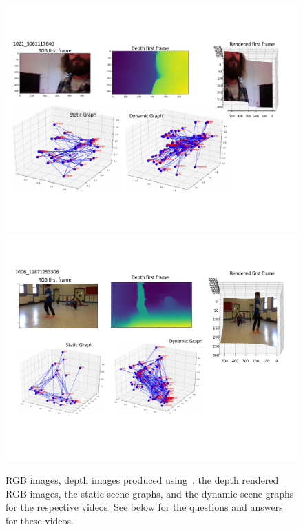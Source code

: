 \documentclass[letterpaper]{article} %
\begin{document}
\begin{figure}
    \centering
    \includegraphics[width=16cm,trim={0cm 3cm 0cm 3.0cm},clip]{./figs/sg_quals_1.pdf}
    \vspace*{10pt}
     \includegraphics[width=16cm,trim={0cm 3cm 0cm 3.0cm},clip]{./figs/sg_quals_2.pdf}
    \caption{RGB images, depth images produced using~\cite{ranftl2019towards}, the depth rendered RGB images, the static scene graphs, and the dynamic scene graphs for the respective videos. See below for the questions and answers for these videos.}
    \label{fig:quals_1}
\end{figure}
\end{document}

